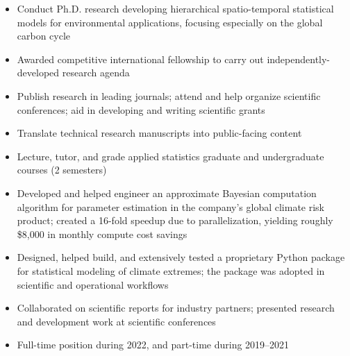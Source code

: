 \documentclass[10pt,a4paper,ragged2e,withhyper]{altacv}
\begin{document}
\vspace{0.1em}
\begin{paracol}{2}



  \begin{itemize}
    \item Conduct Ph.D. research developing hierarchical spatio-temporal statistical models for environmental applications, focusing especially on the global carbon cycle
    \item Awarded competitive international fellowship to carry out independently-developed research agenda
    \item Publish research in leading journals; attend and help organize scientific conferences; aid in developing and writing scientific grants
    \item Translate technical research manuscripts into public-facing content
    \item Lecture, tutor, and grade applied statistics graduate and undergraduate courses (2 semesters)
  \end{itemize}

  \vspace{-0.5em}
  \divider

  \begin{itemize}
    \item Developed and helped engineer an approximate Bayesian computation algorithm for parameter estimation in the company's global climate risk product; created a 16-fold speedup due to parallelization, yielding roughly \$8,000 in monthly compute cost savings
    \item Designed, helped build, and extensively tested a proprietary Python package for statistical modeling of climate extremes; the package was adopted in scientific and operational workflows
    \item Collaborated on scientific reports for industry partners; presented research and development work at scientific conferences
    \item Full-time position during 2022, and part-time during 2019--2021
  \end{itemize}


\end{paracol}
\end{document}
